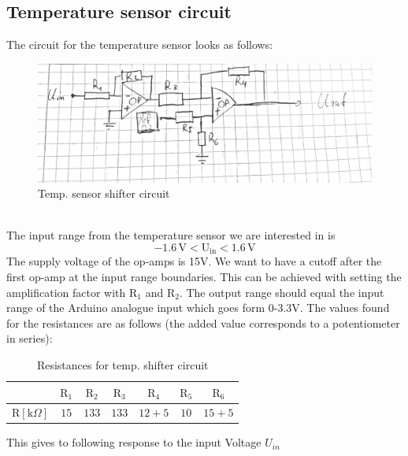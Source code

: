 \documentclass[12pt]{scrartcl}
\begin{document}
    \subsection{Temperature sensor circuit}
      The circuit for the temperature sensor looks as follows:
      \begin{figure}[h]
        \includegraphics[width = \textwidth]{circ.png}
        \caption{Temp. sensor shifter circuit}
        \label{fig1}
      \end{figure}
      \\The input range from the temperature sensor we are interested in is
      $$-1.6 \, \text{V} < \text{U}_{\text{in}} < 1.6\, \text{V}$$
      The supply voltage of the op-amps is 15V. We want to have a cutoff after
      the first op-amp at the input range boundaries. This can be achieved with
      setting the amplification factor with $\text{R}_1$ and $\text{R}_2$. The output range
      should equal the input range of the Arduino analogue input which goes form
      0-3.3V. The values found for the resistances are as follows (the added value
      corresponds to a potentiometer in series): \\
      \begin{table}[H]
        \begin{tabular}{l|c c c c c c}
          & $\text{R}_1$ & $\text{R}_2$ & $\text{R}_3$ & $\text{R}_4$
          & $\text{R}_5$ & $\text{R}_6$ \\
          \hline\vspace{5pt}
          $\text{R}[\text{k}\Omega]$ & $15$ & $133$ & $133$ & $12 + 5$ & $10$
          & $15 + 5$
        \end{tabular}
        \caption{Resistances for temp. shifter circuit}
      \end{table}
      This gives to following response to the input Voltage $U_{in}$\\
\end{document}
